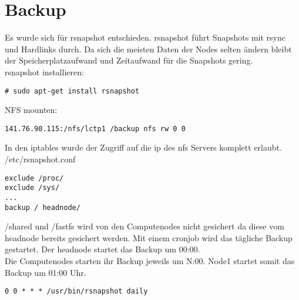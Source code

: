 \chapter{Backup}
Es wurde sich für rsnapshot entschieden. rsnapshot führt Snapshots mit rsync und Hardlinks durch.
Da sich die meisten Daten der Nodes selten ändern bleibt der Speicherplatzaufwand und Zeitaufwand für die Snapshots gering.\\
rsnapshot installieren:
\begin{lstlisting}[style=Bash]
# sudo apt-get install rsnapshot
\end{lstlisting}
NFS mounten:
\begin{lstlisting}[style=Bash]
141.76.90.115:/nfs/lctp1 /backup nfs rw 0 0 
\end{lstlisting}
In den iptables wurde der Zugriff auf die ip des nfs Servers komplett erlaubt.
/etc/rsnapshot.conf
\begin{lstlisting}[style=Bash]
exclude /proc/
exclude /sys/
...
backup / headnode/
\end{lstlisting}
/shared und /fastfs wird von den Computenodes nicht gesichert da diese vom headnode bereits gesichert werden.
Mit einem cronjob wird das tägliche Backup gestartet. Der headnode startet das Backup um 00:00. \\
Die Computenodes starten ihr Backup jeweils um N:00. Node1 startet somit das Backup um 01:00 Uhr.
\begin{lstlisting}[style=Bash]
0 0 * * * /usr/bin/rsnapshot daily
\end{lstlisting}
